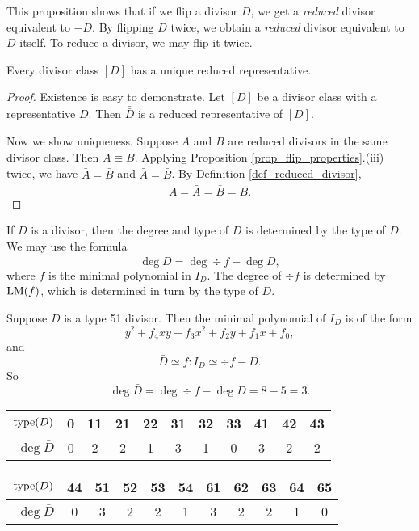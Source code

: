 This proposition shows that if we flip a divisor $D$, we get a \emph{reduced} divisor equivalent to $-D$.
By flipping $D$ twice, we obtain a \emph{reduced} divisor equivalent to $D$ itself.
To reduce a divisor, we may flip it twice.

\begin{theorem}
  Every divisor class $[D]$ has a unique reduced representative.
\end{theorem}
\begin{proof}
  Existence is easy to demonstrate.
  Let $[D]$ be a divisor class with a representative $D$.
  Then $\bar{\bar D}$ is a reduced representative of $[D]$.
  
  Now we show uniqueness.
  Suppose $A$ and $B$ are reduced divisors in the same divisor class.
  Then $A \equiv B$.
  Applying Proposition \ref{prop_flip_properties}.(iii) twice,
  we have $\bar A = \bar B$ and $\bar{\bar A} = \bar{\bar B}$.
  By Definition \ref{def_reduced_divisor},
    \[ A = \bar{\bar A} = \bar{\bar B} = B. \]
\end{proof}

If $D$ is a divisor, then the degree and type of $\bar D$ is determined by the type of $D$.
We may use the formula
\begin{equation}
  \label{eq_flip_degree}
  \deg \bar D = \deg \div f - \deg D,
\end{equation}
where $f$ is the minimal polynomial in $I_D$. The degree of $\div f$ is determined by $\operatorname{LM}(f)$,
which is determined in turn by the type of $D$.
\begin{example}
  Suppose $D$ is a type 51 divisor.
  Then the minimal polynomial of $I_D$ is of the form
  \[ y^2 + f_4xy + f_3x^2 + f_2y + f_1x + f_0, \]
  and
  \[ \bar D \simeq f : I_D \simeq \div f - D. \]
  So
  \[ \deg \bar D = \deg \div f - \deg D = 8 - 5 = 3. \]
\end{example}

\begin{center}
  \begin{tabular}{r|cccccccccc}
    $\operatorname{type}(D)$    & 0 & 11 & 21 & 22 & 31 & 32 & 33 & 41 & 42 & 43 \\
    \hline
    $\deg \bar D$ & 0 & 2  & 2  & 1  & 3  & 1  & 0  & 3  & 2  & 2
  \end{tabular}
    
  \begin{tabular}{r|cccccccccc}
    $\operatorname{type}(D)$    & 44 & 51 & 52 & 53 & 54 & 61 & 62 & 63 & 64 & 65 \\
    \hline 
    $\deg \bar D$ & 0  & 3  & 2  & 2  & 1  & 3  & 2  & 2  & 1  & 0
  \end{tabular}
\end{center}

